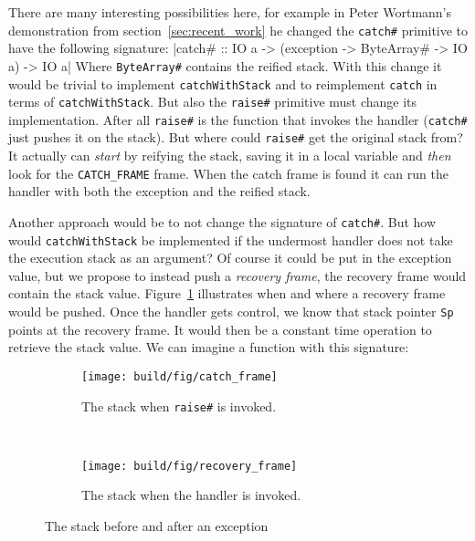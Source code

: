 There are many interesting possibilities here, for example in Peter
Wortmann's demonstration from section~\ref{sec:recent_work} he changed the
\texttt{catch\#} primitive to have the following signature:
|catch# :: IO a -> (exception -> ByteArray# -> IO a) -> IO a|
Where \texttt{ByteArray\#} contains the reified stack. With this change
it would be trivial to implement \texttt{catchWithStack} and
to reimplement \texttt{catch} in terms of \texttt{catchWithStack}. But
also the \texttt{raise\#} primitive must change its implementation. After
all \texttt{raise\#} is the function that invokes the handler
(\texttt{catch\#} just pushes it on the stack). But where could
\texttt{raise\#} get the original stack from? It actually can \emph{start} by
reifying the stack, saving it in a local variable and \emph{then} look
for the \texttt{CATCH\_FRAME} frame. When the catch frame is found it
can run the handler with both the exception and the reified stack.

Another approach would be to not change the signature of
\texttt{catch\#}. But how would \texttt{catchWithStack} be implemented if
the undermost handler does not take the execution stack as an argument?
Of course it could be put in the exception value, but we propose to
instead push a \emph{recovery frame}, the recovery frame would contain
the stack value. Figure~\ref{fig:recovery_frame} illustrates when and
where a recovery frame would be pushed. Once the handler
gets control, we know that stack pointer \texttt{Sp} points
at the recovery frame. It would then be a constant time operation to
retrieve the stack value. We can imagine a function with this
signature:

\begin{figure}
\begin{mdframed}
  \begin{subfigure}[t]{0.5\textwidth}
    \texttt{[image: build/fig/catch\_frame]}
    \caption{The stack when \texttt{raise\#} is invoked.}
  \end{subfigure}
        ~ %
  \begin{subfigure}[t]{0.5\textwidth}
    \texttt{[image: build/fig/recovery\_frame]}
    \caption{The stack when the handler is invoked.}
  \end{subfigure}
  \caption{The stack before and after an exception}
  \label{fig:recovery_frame}
\end{mdframed}
\end{figure}

